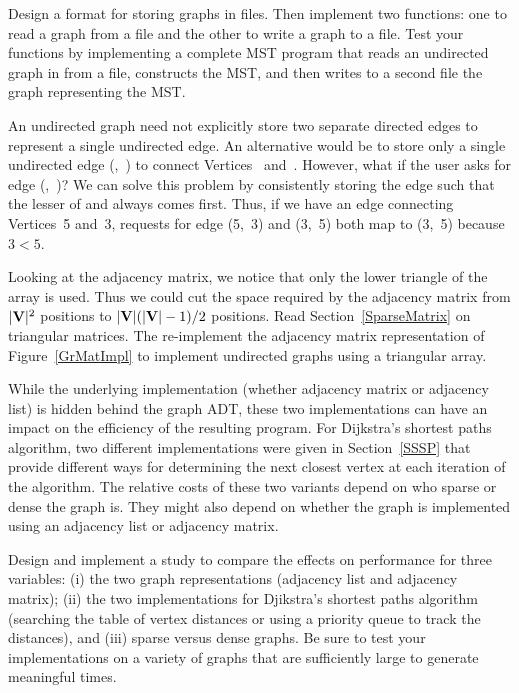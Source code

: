 \begin{projects}

\item
Design a format for storing graphs in files.
Then implement two functions: one to read a graph
from a file and the other to write a graph to a file.
Test your functions by implementing a complete MST program that reads
an undirected graph in from a file, constructs the MST, and then
writes to a second file the graph representing the MST.

\item
\label{TriGraphRep}
An undirected graph need not explicitly store two separate directed
edges to represent a single undirected edge.
An alternative would be to store only a single undirected edge
(,~) to connect Vertices~ and~.
However, what if the user asks for edge (,~)?
We can solve this problem by consistently storing the edge such that
the lesser of  and  always comes first.
Thus, if we have an edge connecting Vertices~5 and~3, requests for
edge (5,~3) and (3,~5) both map to (3,~5) because \(3<5\).

Looking at the adjacency matrix, we notice that only the lower triangle
of the array is used.
Thus we could cut the space required by the adjacency matrix from
\(|{\textbf{V}}|^2\) positions to \(|{\textbf{V}}|(|{\textbf{V}}|-1)/2\)
positions.
Read Section~\ref{SparseMatrix} on triangular matrices.
The re-implement the adjacency matrix representation of
Figure~\ref{GrMatImpl} to implement undirected graphs using a
triangular array.

\item
While the underlying implementation (whether adjacency matrix or
adjacency list) is hidden behind the graph ADT, these two
implementations can have an impact on the efficiency of the resulting
program.
For Dijkstra's shortest paths algorithm, two different implementations
were given in Section~\ref{SSSP} that provide different ways for
determining the next closest vertex at each iteration of the
algorithm.
The relative costs of these two variants depend on who sparse or dense
the graph is.
They might also depend on whether the graph is implemented using an
adjacency list or adjacency matrix.

Design and implement a study to compare the effects on performance for
three variables: (i) the two graph representations (adjacency list and
adjacency matrix); (ii) the two implementations for Djikstra's
shortest paths algorithm (searching the table of vertex distances or
using a priority queue to track the distances), and (iii) sparse
versus dense graphs.
Be sure to test your implementations on a variety of graphs that are
sufficiently large to generate meaningful times.


\end{projects}
